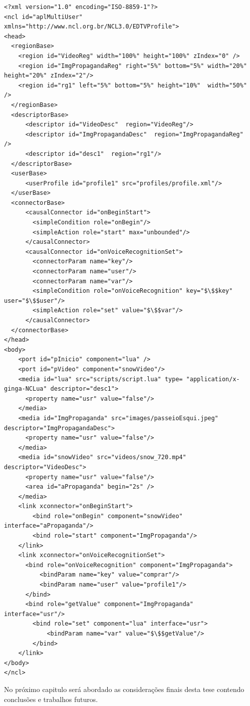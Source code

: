\begin{lstlisting}[language=ncl,label=lst:appIntMultUser, caption={Código da aplicação NCL com interação multiusuário.}]
<?xml version="1.0" encoding="ISO-8859-1"?>
<ncl id="aplMultiUser" xmlns="http://www.ncl.org.br/NCL3.0/EDTVProfile">
<head>
  <regionBase>
    <region id="VideoReg" width="100%" height="100%" zIndex="0" />
    <region id="ImgPropagandaReg" right="5%" bottom="5%" width="20%" height="20%" zIndex="2"/>  
    <region id="rg1" left="5%" bottom="5%" height="10%"  width="50%" />
  </regionBase>
  <descriptorBase>
      <descriptor id="VideoDesc"  region="VideoReg"/>  
      <descriptor id="ImgPropagandaDesc"  region="ImgPropagandaReg"  />
      <descriptor id="desc1"  region="rg1"/> 
  </descriptorBase>
  <userBase>
      <userProfile id="profile1" src="profiles/profile.xml"/>
  </userBase>
  <connectorBase>
      <causalConnector id="onBeginStart">
        <simpleCondition role="onBegin"/>
        <simpleAction role="start" max="unbounded"/>
      </causalConnector> 
      <causalConnector id="onVoiceRecognitionSet">
        <connectorParam name="key"/>
        <connectorParam name="user"/>      
        <connectorParam name="var"/>      
        <simpleCondition role="onVoiceRecognition" key="$\$$key" user="$\$$user"/>
        <simpleAction role="set" value="$\$$var"/>
      </causalConnector>
  </connectorBase>
</head>
<body>
    <port id="pInicio" component="lua" />
    <port id="pVideo" component="snowVideo"/>
    <media id="lua" src="scripts/script.lua" type= "application/x-ginga-NCLua" descriptor="desc1">
      <property name="usr" value="false"/>
    </media>
    <media id="ImgPropaganda" src="images/passeioEsqui.jpeg" descriptor="ImgPropagandaDesc">
      <property name="usr" value="false"/>
    </media>
    <media id="snowVideo" src="videos/snow_720.mp4" descriptor="VideoDesc">
      <property name="usr" value="false"/>
      <area id="aPropaganda" begin="2s" /> 
    </media>
    <link xconnector="onBeginStart">
        <bind role="onBegin" component="snowVideo" interface="aPropaganda"/>
        <bind role="start" component="ImgPropaganda"/>
    </link>
    <link xconnector="onVoiceRecognitionSet">
      <bind role="onVoiceRecognition" component="ImgPropaganda">
          <bindParam name="key" value="comprar"/>
          <bindParam name="user" value="profile1"/>
      </bind> 
      <bind role="getValue" component="ImgPropaganda" interface="usr"/>
        <bind role="set" component="lua" interface="usr">
            <bindParam name="var" value="$\$$getValue"/>
        </bind>
    </link>
</body>
</ncl>
\end{lstlisting}

No próximo capitulo será abordado as considerações finais desta tese contendo conclusões e trabalhos futuros.


